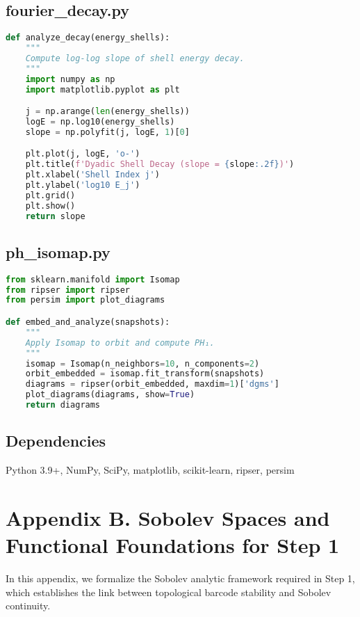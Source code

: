 \documentclass[11pt]{article}
\theoremstyle{definition}
\begin{document}
\subsection*{fourier\_decay.py}
\begin{lstlisting}[language=Python]
def analyze_decay(energy_shells):
    """
    Compute log-log slope of shell energy decay.
    """
    import numpy as np
    import matplotlib.pyplot as plt

    j = np.arange(len(energy_shells))
    logE = np.log10(energy_shells)
    slope = np.polyfit(j, logE, 1)[0]

    plt.plot(j, logE, 'o-')
    plt.title(f'Dyadic Shell Decay (slope = {slope:.2f})')
    plt.xlabel('Shell Index j')
    plt.ylabel('log10 E_j')
    plt.grid()
    plt.show()
    return slope
\end{lstlisting}

\subsection*{ph\_isomap.py}
\begin{lstlisting}[language=Python]
from sklearn.manifold import Isomap
from ripser import ripser
from persim import plot_diagrams

def embed_and_analyze(snapshots):
    """
    Apply Isomap to orbit and compute PH₁.
    """
    isomap = Isomap(n_neighbors=10, n_components=2)
    orbit_embedded = isomap.fit_transform(snapshots)
    diagrams = ripser(orbit_embedded, maxdim=1)['dgms']
    plot_diagrams(diagrams, show=True)
    return diagrams
\end{lstlisting}

\subsection*{Dependencies}
Python 3.9+, NumPy, SciPy, matplotlib, scikit-learn, ripser, persim


\section*{Appendix B. Sobolev Spaces and Functional Foundations for Step 1}

In this appendix, we formalize the Sobolev analytic framework required in Step 1, which establishes the link between topological barcode stability and Sobolev continuity.
\end{document}
